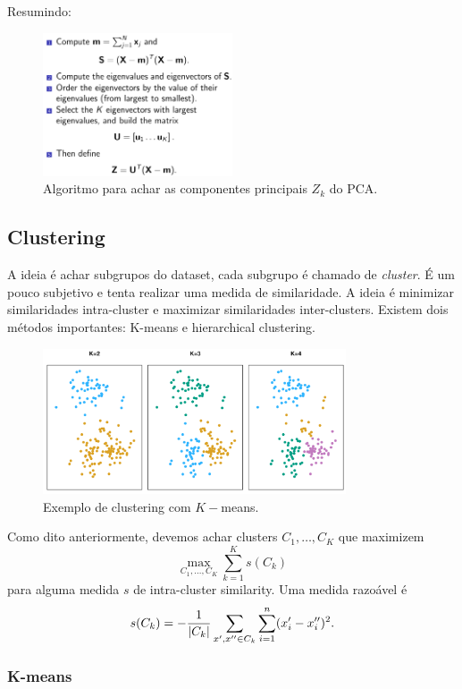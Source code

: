 \documentclass[a4paper,fleqn,12pt]{article}
\begin{document}
Resumindo:
\begin{figure}[H]
\centering
\includegraphics[width=0.5\textwidth]{fig/pca_summary.png}
\caption{Algoritmo para achar as componentes principais $Z_k$ do PCA.}
\label{fig:pca_summary}
\end{figure}

\subsection{Clustering}

A ideia é achar subgrupos do dataset, cada subgrupo é chamado de \textit{cluster}. É um pouco subjetivo e tenta realizar uma medida de similaridade. A ideia é minimizar similaridades intra-cluster e maximizar similaridades inter-clusters. Existem dois métodos importantes: K-means e hierarchical clustering.
\begin{figure}[H]
\centering
\includegraphics[width=0.8\textwidth]{fig/k-means_example.png}
\caption{Exemplo de clustering com $K-$means.}
\label{fig:k-means_example}
\end{figure}

Como dito anteriormente, devemos achar clusters $C_1, \ldots, C_K$ que maximizem
$$
\max_{C_1, \ldots, C_K} \sum_{k=1}^{K} s(C_k)
$$
para alguma medida $s$ de intra-cluster similarity. Uma medida razoável é
$$
s(C_k) = - \frac{1}{\abs{C_k}} \sum_{x',x''\in C_k} \sum_{i=1}^{n} (x_i'-x_i'')^2.
$$

\subsubsection{K-means}
\end{document}

